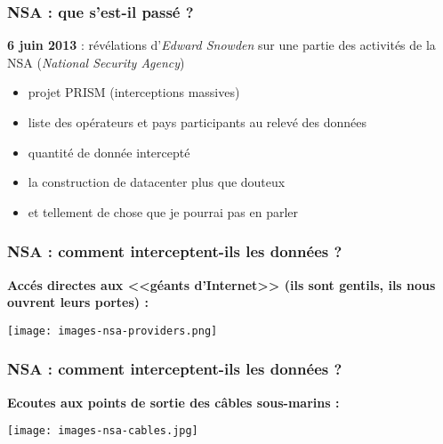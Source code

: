 \begin{frame}\frametitle{NSA : que s'est-il passé ?}
    \textbf{6 juin 2013} : révélations d'\emph{Edward Snowden} sur une partie des
    activités de la \textsc{NSA} (\emph{National Security Agency})

    \begin{itemize}
        \item projet PRISM (interceptions massives)
        \item liste des opérateurs et pays participants au relevé des données
        \item quantité de donnée intercepté
        \item la construction de datacenter plus que douteux
        \item et tellement de chose que je pourrai pas en parler
    \end{itemize}
\end{frame}


\begin{frame}\frametitle{NSA : comment interceptent-ils les données ?}
    \textbf{Accés directes aux <<géants d'Internet>> (ils sont gentils, ils
    nous ouvrent leurs portes) :}
    \vspace{1em}
    \begin{center}
        \texttt{[image: images-nsa-providers.png]}
    \end{center}
\end{frame}


\begin{frame}\frametitle{NSA : comment interceptent-ils les données ?}
    \textbf{Ecoutes aux points de sortie des câbles sous-marins :}
    \vspace{1em}
    \begin{center}
        \texttt{[image: images-nsa-cables.jpg]}
    \end{center}
\end{frame}


